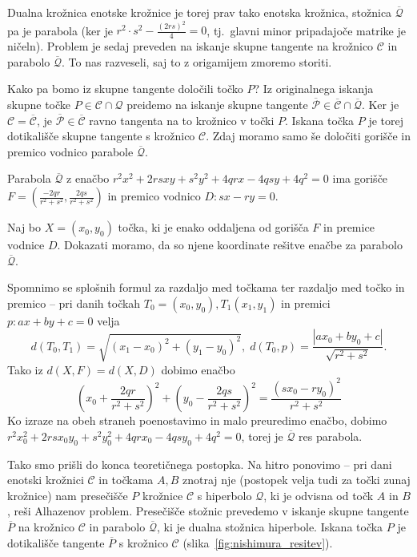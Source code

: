 Dualna krožnica enotske krožnice je torej prav tako enotska krožnica, stožnica $\mathcal{\overline{Q}}$ pa je parabola (ker je $r^2 \cdot s^2 - \frac{(2rs)^2}{4} = 0$, tj.\ glavni minor pripadajoče matrike je ničeln). Problem je sedaj preveden na iskanje skupne tangente na krožnico $\mathcal{C}$ in parabolo $\mathcal{\overline{Q}}$. To nas razveseli, saj to z origamijem zmoremo storiti.

Kako pa bomo iz skupne tangente določili točko $P$? Iz originalnega iskanja skupne točke $P \in \mathcal{C} \cap \mathcal{Q}$ preidemo na iskanje skupne tangente $\mathcal{\overline{P}} \in \mathcal{\overline{C}} \cap \mathcal{\overline{Q}}$. Ker je $\mathcal{C} = \mathcal{\overline{C}}$, je $\mathcal{\overline{P}} \in \mathcal{\overline{C}}$ ravno tangenta na to krožnico v točki $P$. Iskana točka $P$ je torej dotikališče skupne tangente s krožnico $\mathcal{C}$. Zdaj moramo samo še določiti gorišče in premico vodnico parabole $\mathcal{\overline{Q}}$.

\begin{trditev}
    \label{trd:alh_parab_enacba}
    Parabola $\mathcal{\overline{Q}}$ z enačbo $r^2x^2 + 2rsxy + s^2y^2 + 4qrx - 4qsy + 4q^2 = 0$ ima gorišče $F = \left( \frac{-2qr}{r^2+s^2}, \frac{2qs}{r^2+s^2} \right)$ in premico vodnico $D: sx-ry = 0$.
\end{trditev}
\begin{dokaz}
    Naj bo $X = (x_0, y_0)$ točka, ki je enako oddaljena od gorišča $F$ in premice vodnice $D$. Dokazati moramo, da so njene koordinate rešitve enačbe za parabolo $\mathcal{\overline{Q}}$.

    Spomnimo se splošnih formul za razdaljo med točkama ter razdaljo med točko in premico -- pri danih točkah $T_0 = (x_0, y_0), T_1(x_1, y_1)$ in premici $p: ax + by + c = 0$ velja
    $$ d(T_0, T_1) = \sqrt{(x_1-x_0)^2 + (y_1-y_0)^2}, \; d(T_0, p) = \frac{|ax_0+by_0+c|}{\sqrt{r^2+s^2}}.$$
    Tako iz $d(X, F) = d(X, D)$ dobimo enačbo
    $$ \left( x_0 + \frac{2qr}{r^2+s^2} \right)^2 + \left( y_0 - \frac{2qs}{r^2+s^2} \right)^2 = \frac{(sx_0 - ry_0)^2}{r^2+s^2} $$
    Ko izraze na obeh straneh poenostavimo in malo preuredimo enačbo, dobimo $r^2x_0^2 + 2rsx_0y_0 + s^2y_0^2 + 4qrx_0 - 4qsy_0 + 4q^2 = 0$, torej je $\mathcal{\overline{Q}}$ res parabola.
\end{dokaz}

Tako smo prišli do konca teoretičnega postopka. Na hitro ponovimo -- pri dani enotski krožnici $\mathcal{C}$ in točkama $A, B$ znotraj nje (postopek velja tudi za točki zunaj krožnice) nam presečišče $P$ krožnice $\mathcal{C}$ s hiperbolo $\mathcal{Q}$, ki je odvisna od točk $A$ in $B$, reši Alhazenov problem. Presečišče stožnic prevedemo v iskanje skupne tangente $\overline{P}$ na krožnico $\mathcal{C}$ in parabolo $\mathcal{\overline{Q}}$, ki je dualna stožnica hiperbole. Iskana točka $P$ je dotikališče tangente $\overline{P}$ s krožnico $\mathcal{C}$ (slika~\ref{fig:nishimura_resitev}).

